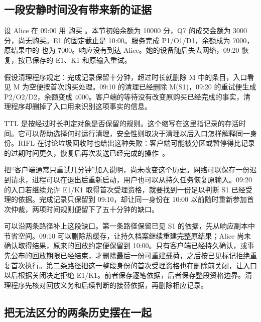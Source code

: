 \subsection*{一段安静时间没有带来新的证据}

设 Alice 在 09:00 用  购买 。本节初始余额为 10000 分，Q7 的成交金额为 3000 分，尚无购买。E1 的固定截止是 10:00。服务完成 P1/O1/D1，余额成为 7000，原结果中的  也为 7000。响应没有到达 Alice。她的设备随后失去网络，09:20 恢复，按已保存的 E1、K1 和原输入重试。

假设清理程序规定：完成记录保留十分钟，超过时长就删除 M 中的条目，入口看见 M 为空便按首次购买处理。09:10 的清理已经删除 M(S1)，09:20 的重试便生成 P2/O2/D2，余额变成 4000。客户端的等待没有改变原购买已经完成的事实，清理程序却删掉了入口用来识别这项事实的信息。

TTL 是按经过时长判定对象是否保留的规则。这个缩写在这里指记录的存活时间。它可以帮助选择何时运行清理，安全性则取决于清理以后入口怎样解释同一身份。RIFL 在讨论垃圾回收时也给出这种失败：客户端可能被分区或暂停得比记录的过期时间更久，恢复后再次发送已经完成的操作~\cite{rifl}。


把“客户端通常只重试几分钟”加入说明，尚未改变这个历史。网络可以保存一份迟到请求，进程可以在退出后重新启动，用户也可以从持久任务恢复原输入。09:20 的入口若继续允许 E1/K1 取得首次受理资格，就要找到一份足以判断 S1 已经受理的依据。完成记录只保留到 09:10，却让同一身份在 10:00 以前随时重新参加首次仲裁，两项时间规则便留下了五十分钟的缺口。

可以沿两条路径补上这段缺口。第一条路径保留已见 S1 的依据，先从响应副本中节省空间。09:10 可以删除热缓存，让持久档案继续重建完整原结果；Alice 尚未确认取得结果，原来的回放约定便保留到 10:00。只有客户端已经持久确认，或事先公布的回放期限已经结束，才删除最后一份可重建载荷，之后按已见标记拒绝重复首次执行。第二条路径把这一整段身份的首次受理资格也在删除前关闭，让入口以后根据关闭决定拒绝 E1/K1。前者保存逐笔依据，后者保存整段资格边界。清理程序先核对回放义务和后续判断的接替依据，再删除相应记录。


\subsection*{把无法区分的两条历史摆在一起}

